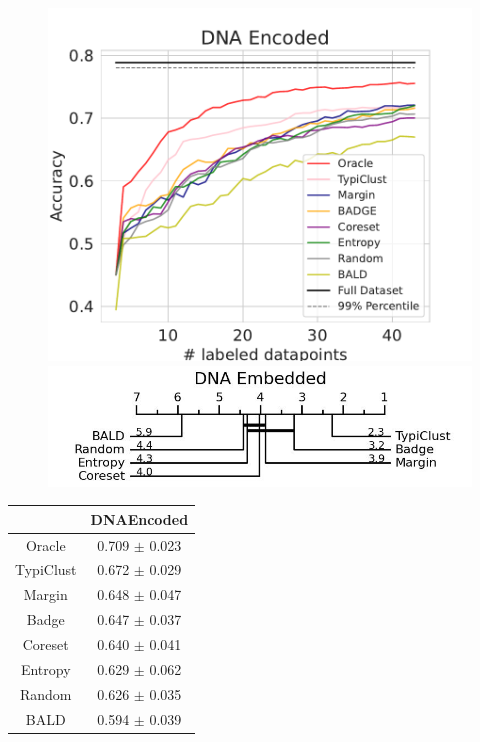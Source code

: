 \documentclass[]{article}
\begin{document}
\begin{minipage}{0.65\linewidth}
\begin{figure}[H]
    \centering
    \includegraphics[width=\linewidth]{img/eval_dna_enc}\\ [2mm]
    \includegraphics[width=\linewidth]{img/micro_dna_enc.jpg} 
\end{figure}
\end{minipage}
\begin{minipage}{0.29\linewidth}
\begin{tabular}{c|c}
&DNAEncoded\\
\hline
Oracle&0.709 $\pm$ 0.023\\
TypiClust&0.672 $\pm$ 0.029\\
Margin&0.648 $\pm$ 0.047\\
Badge&0.647 $\pm$ 0.037\\
Coreset&0.640 $\pm$ 0.041\\
Entropy&0.629 $\pm$ 0.062\\
Random&0.626 $\pm$ 0.035\\
BALD&0.594 $\pm$ 0.039\\
\end{tabular}
\end{minipage}
\end{document}
